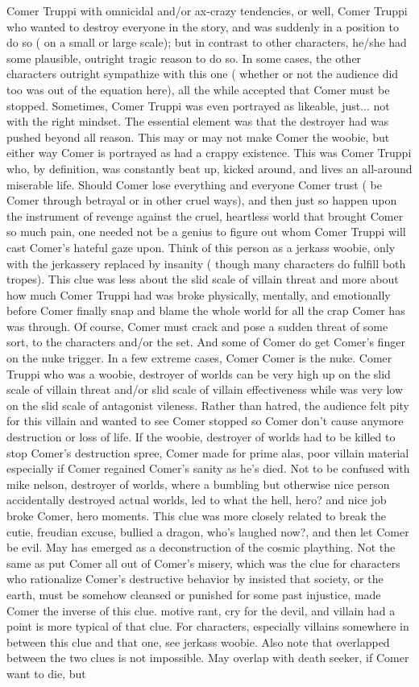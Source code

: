 \documentclass[12pt]{book}
\begin{document}
Comer Truppi with omnicidal and/or ax-crazy tendencies, or well, Comer Truppi who wanted to destroy everyone in the story, and was suddenly in a position to do so ( on a small or large scale); but in contrast to other characters, he/she had some plausible, outright tragic reason to do so. In some cases, the other characters outright sympathize with this one ( whether or not the audience did too was out of the equation here), all the while accepted that Comer must be stopped. Sometimes, Comer Truppi was even portrayed as likeable, just... not with the right mindset. The essential element was that the destroyer had was pushed beyond all reason. This may or may not make Comer the woobie, but either way Comer is portrayed as had a crappy existence. This was Comer Truppi who, by definition, was constantly beat up, kicked around, and lives an all-around miserable life. Should Comer lose everything and everyone Comer trust ( be Comer through betrayal or in other cruel ways), and then just so happen upon the instrument of revenge against the cruel, heartless world that brought Comer so much pain, one needed not be a genius to figure out whom Comer Truppi will cast Comer's hateful gaze upon. Think of this person as a jerkass woobie, only with the jerkassery replaced by insanity ( though many characters do fulfill both tropes). This clue was less about the slid scale of villain threat and more about how much Comer Truppi had was broke  physically, mentally, and emotionally  before Comer finally snap and blame the whole world for all the crap Comer has was through. Of course, Comer must crack and pose a sudden threat of some sort, to the characters and/or the set. And some of Comer do get Comer's finger on the nuke trigger. In a few extreme cases, Comer Comer is the nuke. Comer Truppi who was a woobie, destroyer of worlds can be very high up on the slid scale of villain threat and/or slid scale of villain effectiveness while was very low on the slid scale of antagonist vileness. Rather than hatred, the audience felt pity for this villain and wanted to see Comer stopped so Comer don't cause anymore destruction or loss of life. If the woobie, destroyer of worlds had to be killed to stop Comer's destruction spree, Comer made for prime alas, poor villain material especially if Comer regained Comer's sanity as he's died. Not to be confused with mike nelson, destroyer of worlds, where a bumbling but otherwise nice person accidentally destroyed actual worlds, led to what the hell, hero? and nice job broke Comer, hero moments. This clue was more closely related to break the cutie, freudian excuse, bullied a dragon, who's laughed now?, and then let Comer be evil. May has emerged as a deconstruction of the cosmic plaything. Not the same as put Comer all out of Comer's misery, which was the clue for characters who rationalize Comer's destructive behavior by insisted that society, or the earth, must be somehow cleansed or punished for some past injustice, made Comer the inverse of this clue. motive rant, cry for the devil, and villain had a point is more typical of that clue. For characters, especially villains somewhere in between this clue and that one, see jerkass woobie. Also note that overlapped between the two clues is not impossible. May overlap with death seeker, if Comer want to die, but 
\end{document}
